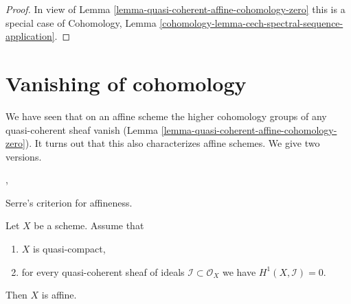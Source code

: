 \begin{proof}
In view of
Lemma \ref{lemma-quasi-coherent-affine-cohomology-zero}
this is a special case of
Cohomology, Lemma
\ref{cohomology-lemma-cech-spectral-sequence-application}.
\end{proof}







\section{Vanishing of cohomology}
\label{section-vanishing}

\noindent
We have seen that on an affine scheme the higher cohomology groups
of any quasi-coherent sheaf vanish
(Lemma \ref{lemma-quasi-coherent-affine-cohomology-zero}).
It turns out that this also
characterizes affine schemes. We give two versions.

\begin{lemma}
\label{lemma-quasi-compact-h1-zero-covering}
\begin{reference}
\cite{Serre-criterion}, \cite[II, Theorem 5.2.1 (d') and IV (1.7.17)]{EGA}
\end{reference}
\begin{slogan}
Serre's criterion for affineness.
\end{slogan}
Let $X$ be a scheme.
Assume that
\begin{enumerate}
\item $X$ is quasi-compact,
\item for every quasi-coherent sheaf of ideals
$\mathcal{I} \subset \mathcal{O}_X$ we have $H^1(X, \mathcal{I}) = 0$.
\end{enumerate}
Then $X$ is affine.
\end{lemma}

